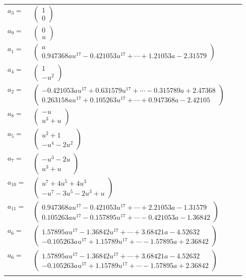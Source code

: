 \documentclass[1p]{elsarticle_modified}
\theoremstyle{definition}
\begin{document}
\begin{tabular}{m{7pt} m{180pt} m{7pt} m{180pt} }
\flushright $a_{3}=$&$\begin{pmatrix}1\\0\end{pmatrix}$ \\
\flushright $a_{9}=$&$\begin{pmatrix}0\\u\end{pmatrix}$ \\
\flushright $a_{1}=$&$\begin{pmatrix}a\\0.947368 a u^{17}-0.421053 u^{17}+\cdots+1.21053 a-2.31579\end{pmatrix}$ \\
\flushright $a_{4}=$&$\begin{pmatrix}1\\- u^2\end{pmatrix}$ \\
\flushright $a_{2}=$&$\begin{pmatrix}-0.421053 a u^{17}+0.631579 u^{17}+\cdots-0.315789 a+2.47368\\0.263158 a u^{17}+0.105263 u^{17}+\cdots+0.947368 a-2.42105\end{pmatrix}$ \\
\flushright $a_{8}=$&$\begin{pmatrix}- u\\u^3+u\end{pmatrix}$ \\
\flushright $a_{5}=$&$\begin{pmatrix}u^2+1\\- u^4-2 u^2\end{pmatrix}$ \\
\flushright $a_{7}=$&$\begin{pmatrix}- u^3-2 u\\u^3+u\end{pmatrix}$ \\
\flushright $a_{10}=$&$\begin{pmatrix}u^7+4 u^5+4 u^3\\- u^7-3 u^5-2 u^3+u\end{pmatrix}$ \\
\flushright $a_{11}=$&$\begin{pmatrix}0.947368 a u^{17}-0.421053 u^{17}+\cdots+2.21053 a-1.31579\\0.105263 a u^{17}-0.157895 u^{17}+\cdots-0.421053 a-1.36842\end{pmatrix}$ \\
\flushright $a_{6}=$&$\begin{pmatrix}1.57895 a u^{17}-1.36842 u^{17}+\cdots+3.68421 a-4.52632\\-0.105263 a u^{17}+1.15789 u^{17}+\cdots-1.57895 a+2.36842\end{pmatrix}$\\ \flushright $a_{6}=$&$\begin{pmatrix}1.57895 a u^{17}-1.36842 u^{17}+\cdots+3.68421 a-4.52632\\-0.105263 a u^{17}+1.15789 u^{17}+\cdots-1.57895 a+2.36842\end{pmatrix}$\\&\end{tabular}
\end{document}
